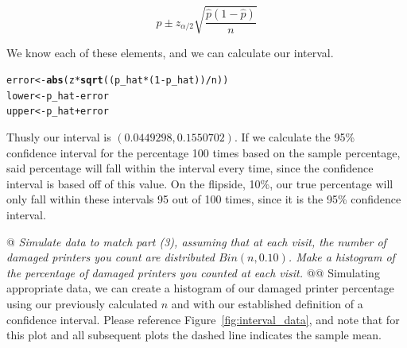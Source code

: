 \documentclass[10pt]{report}\usepackage[]{graphicx}\usepackage[]{xcolor}
\makeatletter
\newcommand{\hlnum}[1]{\textcolor[rgb]{0.686,0.059,0.569}{#1}}%
\newcommand{\hlopt}[1]{\textcolor[rgb]{0,0,0}{#1}}%
\newcommand{\hlstd}[1]{\textcolor[rgb]{0.345,0.345,0.345}{#1}}%
\newcommand{\hlkwb}[1]{\textcolor[rgb]{0.69,0.353,0.396}{#1}}%
\newcommand{\hlkwd}[1]{\textcolor[rgb]{0.737,0.353,0.396}{\textbf{#1}}}%
\newenvironment{kframe}{%
 \def\at@end@of@kframe{}%
 \ifinner\ifhmode%
  \def\at@end@of@kframe{\end{minipage}}%
  \begin{minipage}{\columnwidth}%
 \fi\fi%
 \def\FrameCommand##1{\hskip\@totalleftmargin \hskip-\fboxsep
 \colorbox{shadecolor}{##1}\hskip-\fboxsep
     \hskip-\linewidth \hskip-\@totalleftmargin \hskip\columnwidth}%
 \MakeFramed {\advance\hsize-\width
   \@totalleftmargin\z@ \linewidth\hsize
   \@setminipage}}%
 {\par\unskip\endMakeFramed%
 \at@end@of@kframe}
\newenvironment{knitrout}{}{} %
\makeatother
\begin{document}
\begin{easylist}[enumerate]
        \[
            \hat{p} \pm z_{\alpha/2} \sqrt{\frac{\hat{p} (1 - \hat{p})}{n} }
        \]

        We know each of these elements, and we can calculate our interval.

\begin{knitrout}
\color{fgcolor}\begin{kframe}
\begin{alltt}
         \hlstd{error} \hlkwb{<-} \hlkwd{abs}\hlstd{(z} \hlopt{*} \hlkwd{sqrt}\hlstd{((p_hat} \hlopt{*} \hlstd{(}\hlnum{1} \hlopt{-} \hlstd{p_hat))}\hlopt{/}\hlstd{n))}
         \hlstd{lower} \hlkwb{<-} \hlstd{p_hat} \hlopt{-} \hlstd{error}
         \hlstd{upper} \hlkwb{<-} \hlstd{p_hat} \hlopt{+} \hlstd{error}
\end{alltt}
\end{kframe}
\end{knitrout}

        Thusly our interval is $\boxed{\left( 0.0449298, 0.1550702 \right)}$. If we calculate the 95\%
        confidence interval for the percentage 100 times based on the sample percentage, said percentage will fall
        within the interval every time, since the confidence interval is based off of this value. On the flipside, 10\%,
        our true percentage will only fall within these intervals 95 out of 100 times, since it is the 95\% confidence
        interval.

        \newpage
        @ \textit{Simulate data to match part (3), assuming that at each visit, the number of damaged printers you count
        are distributed $Bin(n, 0.10)$. Make a histogram of the percentage of damaged printers you counted at each
        visit.}
        @@ Simulating appropriate data, we can create a histogram of our damaged printer percentage using our previously
        calculated $n$ and with our established definition of a confidence interval. Please reference
        Figure~\ref{fig:interval_data}, and note that for this plot and all subsequent plots the dashed line indicates
        the sample mean.


\end{easylist}
\end{document}
